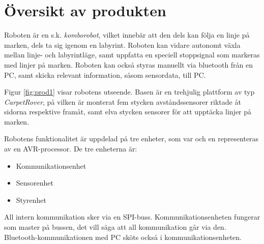 
%
%
 
\section{Översikt av produkten}

Roboten är en s.k. \emph{komborobot}, vilket innebär att den dels kan följa en 
linje på marken, dels ta sig igenom en labyrint. Roboten kan vidare autonomt 
växla mellan linje- och labyrintläge, samt uppfatta en speciell stoppsignal som
markeras med linjer på marken. Roboten kan också styras manuellt via bluetooth 
från en PC, samt skicka relevant information, såsom sensordata, till PC. 

Figur \ref{fig:prod1} visar robotens utseende. Basen är en trehjulig plattform 
av typ \emph{CarpetRover}, på vilken är monterat fem stycken avståndssensorer 
riktade åt sidorna respektive framåt, samt elva stycken sensorer för att upptäcka 
linjer på marken. 


Robotens funktionalitet är uppdelad på tre enheter, som var och en 
representeras av en AVR-processor. De tre enheterna är: 
\begin{itemize}
        \item Kommunikationsenhet
        \item Sensorenhet
        \item Styrenhet
\end{itemize}

All intern kommunikation sker via en SPI-buss. 
Kommunikationsenheten fungerar som master på bussen, det vill säga att all 
kommunikation går via den. Bluetooth-kommunikationen med PC sköts också i 
kommunikationsenheten.
